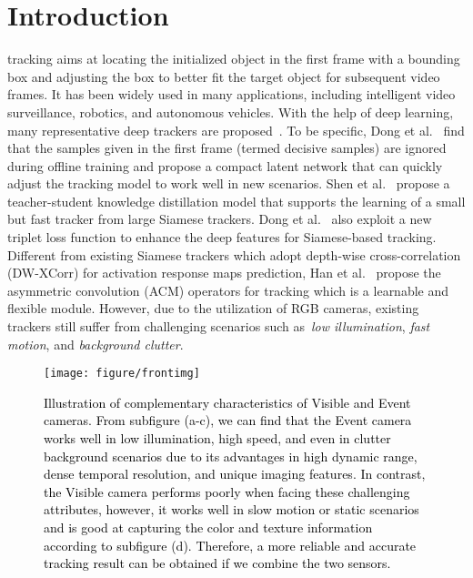 \documentclass[journal]{IEEEtran}
\begin{document}
\section{Introduction} 
 tracking aims at locating the initialized object in the first frame with a bounding box and adjusting the box to better fit the target object for subsequent video frames. It has been widely used in many applications, including intelligent video surveillance, robotics, and autonomous vehicles. 
With the help of deep learning, many representative deep trackers are proposed~\cite{zhang2021learn, wang2021towards, wang2021gantrack, wang2021deepmta, dong2020clnet, shen2021distilled, dong2018tripletSiam, han2021learning, wang2022beamTrack}. To be specific, Dong et al.~\cite{dong2020clnet} find that the samples given in the first frame (termed decisive samples) are ignored during offline training and propose a compact latent network that can quickly adjust the tracking model to work well in new scenarios. Shen et al.~\cite{shen2021distilled} propose a teacher-student knowledge distillation model that supports the learning of a small but fast tracker from large Siamese trackers. Dong et al.~\cite{dong2018tripletSiam} also exploit a new triplet loss function to enhance the deep features for Siamese-based tracking. Different from existing Siamese trackers which adopt depth-wise cross-correlation (DW-XCorr) for activation response maps prediction, Han et al.~\cite{han2021learning} propose the asymmetric convolution (ACM) operators for tracking which is a learnable and flexible module. However, due to the utilization of RGB cameras, existing trackers still suffer from challenging scenarios such as~\emph{low illumination}, \emph{fast motion}, and \emph{background clutter}. 




\begin{figure}
\center
\texttt{[image: figure/frontimg]}
\caption{
\textcolor{black}{Illustration of complementary characteristics of Visible and Event cameras. From subfigure (a-c), we can find that the Event camera works well in low illumination, high speed, and even in clutter background scenarios due to its advantages in high dynamic range, dense temporal resolution, and unique imaging features. In contrast, the Visible camera performs poorly when facing these challenging attributes, however, it works well in slow motion or static scenarios and is good at capturing the color and texture information according to subfigure (d). Therefore, a more reliable and accurate tracking result can be obtained if we combine the two sensors.}
} 
\label{frontimg}
\end{figure} 	
\end{document}
